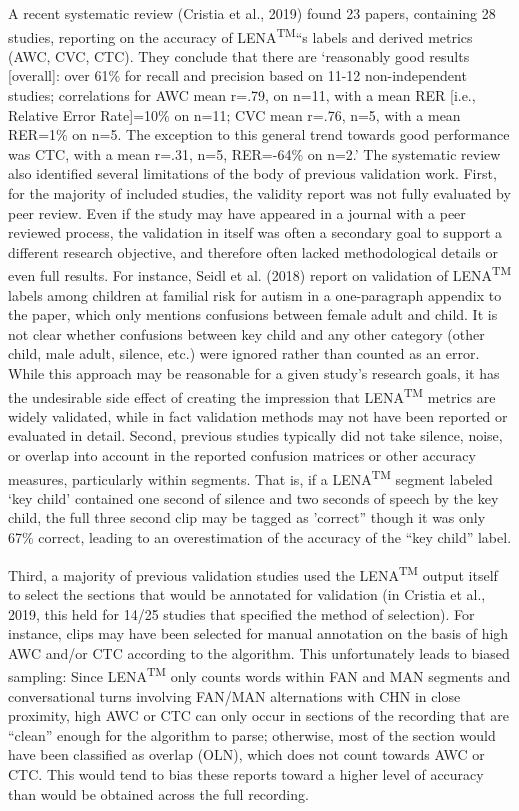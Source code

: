 \documentclass[english,table,man,floatsintext]{apa6}
\begin{document}
A recent systematic review (Cristia et al., 2019) found 23 papers, containing 28 studies, reporting on the accuracy of LENA\textsuperscript{TM}\enquote{s labels and derived metrics (AWC, CVC, CTC). They conclude that there are \enquote{reasonably good results {[}overall{]}: over 61\% for recall and precision based on 11-12 non-independent studies; correlations for AWC mean r=.79, on n=11, with a mean RER {[}i.e., Relative Error Rate{]}=10\% on n=11; CVC mean r=.76, n=5, with a mean RER=1\% on n=5. The exception to this general trend towards good performance was CTC, with a mean r=.31, n=5, RER=-64\% on n=2.} The systematic review also identified several limitations of the body of previous validation work. First, for the majority of included studies, the validity report was not fully evaluated by peer review. Even if the study may have appeared in a journal with a peer reviewed process, the validation in itself was often a secondary goal to support a different research objective, and therefore often lacked methodological details or even full results. For instance, Seidl et al. (2018) report on validation of LENA\textsuperscript{TM} labels among children at familial risk for autism in a one-paragraph appendix to the paper, which only mentions confusions between female adult and child. It is not clear whether confusions between key child and any other category (other child, male adult, silence, etc.) were ignored rather than counted as an error. While this approach may be reasonable for a given study's research goals, it has the undesirable side effect of creating the impression that LENA\textsuperscript{TM} metrics are widely validated, while in fact validation methods may not have been reported or evaluated in detail.
Second, previous studies typically did not take silence, noise, or overlap into account in the reported confusion matrices or other accuracy measures, particularly within segments. That is, if a LENA\textsuperscript{TM} segment labeled \enquote{key child} contained one second of silence and two seconds of speech by the key child, the full three second clip may be tagged as 'correct} though it was only 67\% correct, leading to an overestimation of the accuracy of the \enquote{key child} label.

Third, a majority of previous validation studies used the LENA\textsuperscript{TM} output itself to select the sections that would be annotated for validation (in Cristia et al., 2019, this held for 14/25 studies that specified the method of selection). For instance, clips may have been selected for manual annotation on the basis of high AWC and/or CTC according to the algorithm. This unfortunately leads to biased sampling: Since LENA\textsuperscript{TM} only counts words within FAN and MAN segments and conversational turns involving FAN/MAN alternations with CHN in close proximity, high AWC or CTC can only occur in sections of the recording that are \enquote{clean} enough for the algorithm to parse; otherwise, most of the section would have been classified as overlap (OLN), which does not count towards AWC or CTC. This would tend to bias these reports toward a higher level of accuracy than would be obtained across the full recording.
\end{document}
